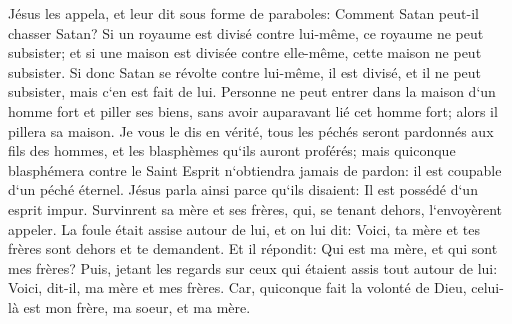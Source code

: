 \verse Jésus les appela, et leur dit sous forme de paraboles: Comment Satan peut-il chasser Satan? 
\verse Si un royaume est divisé contre lui-même, ce royaume ne peut subsister; 
\verse et si une maison est divisée contre elle-même, cette maison ne peut subsister. 
\verse Si donc Satan se révolte contre lui-même, il est divisé, et il ne peut subsister, mais c`en est fait de lui. 
\verse Personne ne peut entrer dans la maison d`un homme fort et piller ses biens, sans avoir auparavant lié cet homme fort; alors il pillera sa maison. 
\verse Je vous le dis en vérité, tous les péchés seront pardonnés aux fils des hommes, et les blasphèmes qu`ils auront proférés; 
\verse mais quiconque blasphémera contre le Saint Esprit n`obtiendra jamais de pardon: il est coupable d`un péché éternel. 
\verse Jésus parla ainsi parce qu`ils disaient: Il est possédé d`un esprit impur. 
\verse Survinrent sa mère et ses frères, qui, se tenant dehors, l`envoyèrent appeler. 
\verse La foule était assise autour de lui, et on lui dit: Voici, ta mère et tes frères sont dehors et te demandent. 
\verse Et il répondit: Qui est ma mère, et qui sont mes frères? 
\verse Puis, jetant les regards sur ceux qui étaient assis tout autour de lui: Voici, dit-il, ma mère et mes frères. 
\verse Car, quiconque fait la volonté de Dieu, celui-là est mon frère, ma soeur, et ma mère. 

